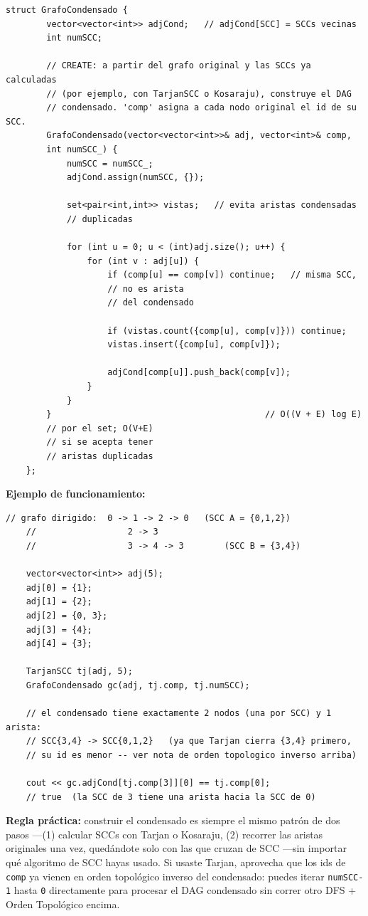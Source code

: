 \documentclass[10pt,a4paper,twocolumn]{article}
\begin{document}
\begin{lstlisting}[style=cpp]
	struct GrafoCondensado {
		vector<vector<int>> adjCond;   // adjCond[SCC] = SCCs vecinas
		int numSCC;
		
		// CREATE: a partir del grafo original y las SCCs ya calculadas
		// (por ejemplo, con TarjanSCC o Kosaraju), construye el DAG
		// condensado. 'comp' asigna a cada nodo original el id de su SCC.
		GrafoCondensado(vector<vector<int>>& adj, vector<int>& comp,
		int numSCC_) {
			numSCC = numSCC_;
			adjCond.assign(numSCC, {});
			
			set<pair<int,int>> vistas;   // evita aristas condensadas
			// duplicadas
			
			for (int u = 0; u < (int)adj.size(); u++) {
				for (int v : adj[u]) {
					if (comp[u] == comp[v]) continue;   // misma SCC,
					// no es arista
					// del condensado
					
					if (vistas.count({comp[u], comp[v]})) continue;
					vistas.insert({comp[u], comp[v]});
					
					adjCond[comp[u]].push_back(comp[v]);
				}
			}
		}                                          // O((V + E) log E)
		// por el set; O(V+E)
		// si se acepta tener
		// aristas duplicadas
	};
\end{lstlisting}

\textbf{Ejemplo de funcionamiento:}

\begin{lstlisting}[style=cpp]
	// grafo dirigido:  0 -> 1 -> 2 -> 0   (SCC A = {0,1,2})
	//                  2 -> 3
	//                  3 -> 4 -> 3        (SCC B = {3,4})
	
	vector<vector<int>> adj(5);
	adj[0] = {1};
	adj[1] = {2};
	adj[2] = {0, 3};
	adj[3] = {4};
	adj[4] = {3};
	
	TarjanSCC tj(adj, 5);
	GrafoCondensado gc(adj, tj.comp, tj.numSCC);
	
	// el condensado tiene exactamente 2 nodos (una por SCC) y 1 arista:
	// SCC{3,4} -> SCC{0,1,2}   (ya que Tarjan cierra {3,4} primero,
	// su id es menor -- ver nota de orden topologico inverso arriba)
	
	cout << gc.adjCond[tj.comp[3]][0] == tj.comp[0];
	// true  (la SCC de 3 tiene una arista hacia la SCC de 0)
\end{lstlisting}

\textbf{Regla práctica:} construir el condensado es siempre el mismo
patrón de dos pasos —(1) calcular SCCs con Tarjan o Kosaraju, (2)
recorrer las aristas originales una vez, quedándote solo con las que
cruzan de SCC —sin importar qué algoritmo de SCC hayas usado. Si
usaste Tarjan, aprovecha que los ids de \texttt{comp} ya vienen en
orden topológico inverso del condensado: puedes iterar
\texttt{numSCC-1} hasta \texttt{0} directamente para procesar el DAG
condensado sin correr otro DFS + Orden Topológico encima.
\end{document}

